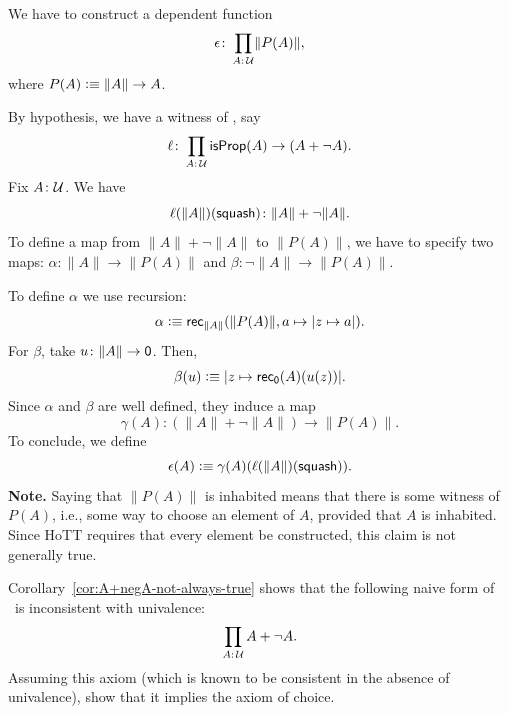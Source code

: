 \begin{solution}
    We have to construct a dependent function
    \[
        \epsilon\colon\prod_{A\colon\univ}
            \lVert P(A)\rVert,
    \]
    where $P(A)\mathrel{\vcentcolon}\equiv\lVert A\rVert\to A$.
    
    By hypothesis, we have a witness of \Lem, say
    \[
        \ell\colon\prod_{A\colon\univ}\fun{isProp}(A)\to(A+\neg A).
    \]
    Fix $A\colon\univ$. We have
    \[
        \ell(\lVert A\rVert)(\fun{squash})
            \colon\lVert A\rVert+\neg\lVert A\rVert.
    \]
    To define a map from $\lVert A\rVert+\neg\lVert A\rVert$ to $\lVert P(A)\rVert$, we have to specify two maps: $\alpha\colon\lVert A\rVert\to\lVert P(A)\rVert$ and $\beta\colon\neg\lVert A\rVert\to\lVert P(A)\rVert$.

    To define $\alpha$ we use recursion:
    \[
        \alpha\mathrel{\vcentcolon}\equiv
            \mathsf{rec}_{\lVert A\rVert}
                (
                    \lVert P(A)\rVert,
                    a\mapsto\lvert z\mapsto a\rvert
                ).
    \]
    For $\beta$, take $u\colon\lVert A\rVert\to\fun0$. Then,
    \[
        \beta(u)\mathrel{\vcentcolon}\equiv
            \lvert z\mapsto\mathsf{rec}_{\mathsf{0}}(A)(u(z))\rvert.
    \]
    Since $\alpha$ and $\beta$ are well defined, they induce a map
    \[
        \gamma(A)\colon(\lVert A\rVert+\neg\lVert A\rVert)\to\lVert P(A)\rVert.
    \]
    To conclude, we define
    \[
        \epsilon(A)\mathrel{\vcentcolon}\equiv\gamma(A)(\ell(\lVert A\rVert)(\mathsf{squash})).
    \]
    \textbf{Note.} Saying that $\lVert P(A)\rVert$ is inhabited means that there is some witness of $P(A)$, i.e., some way to choose an element of $A$, provided that $A$ is inhabited. Since HoTT requires that every element be constructed, this claim is not generally true.
    
\end{solution}

\begin{exr}\fe
    {\upshape Corollary~\ref{cor:A+negA-not-always-true}} shows that the following naive form of\/ \Lem\ is inconsistent with univalence:
    \[
        \prod_{A\colon\univ}A+\neg A.
    \]
    Assuming this axiom (which is known to be consistent in the absence of univalence), show that it implies the axiom of choice.
\end{exr}

